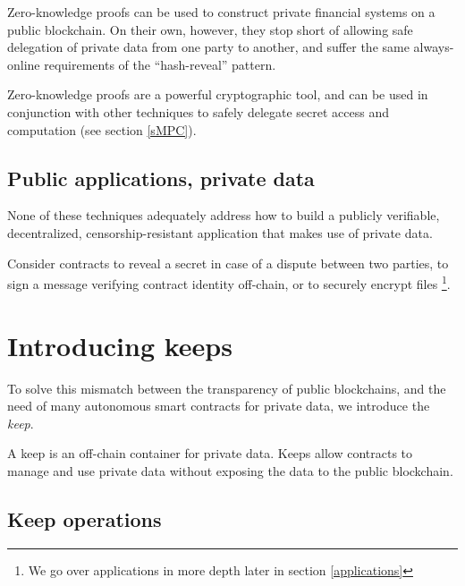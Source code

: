 \documentclass[11pt]{article}
\begin{document}
Zero-knowledge proofs can be used to construct private financial
systems on a public blockchain. On their own, however, they stop short
of allowing safe delegation of private data from one party to another,
and suffer the same always-online requirements of the ``hash-reveal''
pattern.

Zero-knowledge proofs are a powerful cryptographic tool, and can be
used in conjunction with other techniques to safely delegate secret
access and computation (see section \ref{sMPC}).

\subsection{Public applications, private data}

None of these techniques adequately address how to build a publicly
verifiable, decentralized, censorship-resistant application that makes
use of private data.

Consider contracts to reveal a secret in case of a dispute between two
parties, to sign a message verifying contract identity off-chain, or
to securely encrypt files \footnote{We go over applications in more
depth later in section \ref{applications}}.

\section{Introducing keeps}

To solve this mismatch between the transparency of public blockchains,
and the need of many autonomous smart contracts for private data, we
introduce the {\em keep}.

A keep is an off-chain container for private data. Keeps allow
contracts to manage and use private data without exposing the data to
the public blockchain.

\subsection{Keep operations}
\end{document}
